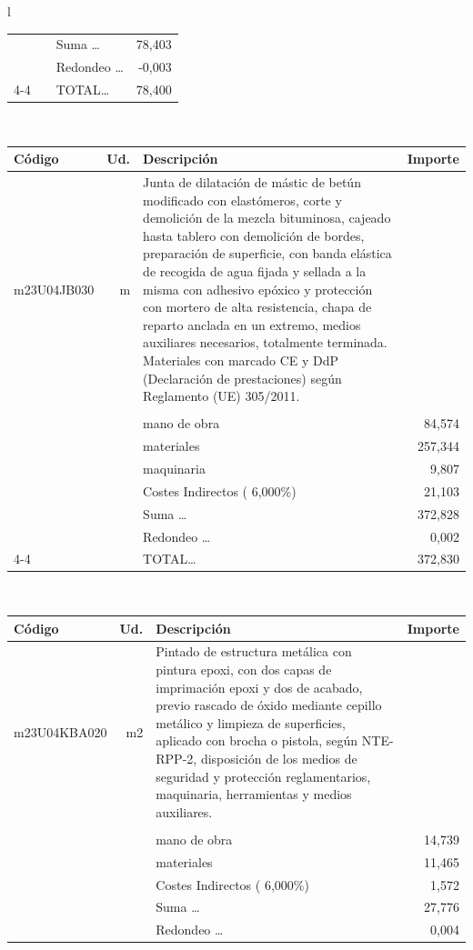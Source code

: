 \documentclass{book}%
\begin{document}
\begin{longtable}{l}
\begin{tabular}{l r p{60mm} r}
&&Suma \ldots&    78,403\\%
&&Redondeo \ldots&    {-}0,003\\%
\cline{4-4}%
&&TOTAL\ldots&    78,400\\%
\end{tabular}\\%
\begin{tabular}{l r p{60mm} r}%
Código&Ud.&Descripción&Importe\\%
\hline%
m23U04JB030&m&Junta de dilatación de mástic de betún modificado con elastómeros, corte y demolición de la mezcla bituminosa, cajeado hasta tablero con demolición de bordes, preparación de superficie, con banda elástica de recogida de agua fijada y sellada a la misma con adhesivo epóxico y protección con mortero de alta resistencia, chapa de reparto anclada en un extremo, medios auxiliares necesarios, totalmente terminada. Materiales con marcado CE y DdP (Declaración de prestaciones) según Reglamento (UE) 305/2011.&\\%
&&&\\%
&&mano de obra&    84,574\\%
&&materiales&   257,344\\%
&&maquinaria&     9,807\\%
&&Costes Indirectos (     6,000\%)&    21,103\\%
&&Suma \ldots&   372,828\\%
&&Redondeo \ldots&     0,002\\%
\cline{4-4}%
&&TOTAL\ldots&   372,830\\%
\end{tabular}\\%
\begin{tabular}{l r p{60mm} r}%
Código&Ud.&Descripción&Importe\\%
\hline%
m23U04KBA020&m2&Pintado de estructura metálica con pintura epoxi, con dos capas de imprimación epoxi y dos de acabado, previo rascado de óxido mediante cepillo metálico y limpieza de superficies, aplicado con brocha o pistola, según NTE{-}RPP{-}2, disposición de los medios de seguridad y protección reglamentarios, maquinaria, herramientas y medios auxiliares.&\\%
&&&\\%
&&mano de obra&    14,739\\%
&&materiales&    11,465\\%
&&Costes Indirectos (     6,000\%)&     1,572\\%
&&Suma \ldots&    27,776\\%
&&Redondeo \ldots&     0,004\\%

\end{tabular}
\end{longtable}
\end{document}
